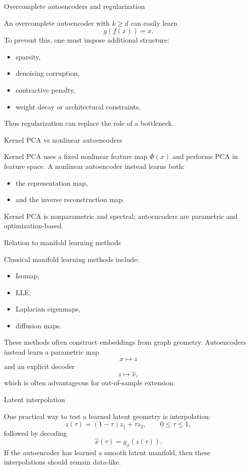 \documentclass[aspectratio=169]{beamer}
\begin{document}
\begin{frame}{Overcomplete autoencoders and regularization}

An overcomplete autoencoder with \(k\ge d\) can easily learn
\[
g(f(x))=x.
\]
To prevent this, one must impose additional structure:
\begin{itemize}
\item sparsity,
\item denoising corruption,
\item contractive penalty,
\item weight decay or architectural constraints.
\end{itemize}
Thus regularization can replace the role of a bottleneck.

\end{frame}

\begin{frame}{Kernel PCA vs nonlinear autoencoders}

Kernel PCA uses a fixed nonlinear feature map \(\Phi(x)\) and performs PCA in feature space.
A nonlinear autoencoder instead learns both:
\begin{itemize}
\item the representation map,
\item and the inverse reconstruction map.
\end{itemize}
Kernel PCA is nonparametric and spectral;
autoencoders are parametric and optimization-based.

\end{frame}

\begin{frame}{Relation to manifold learning methods}

Classical manifold learning methods include:
\begin{itemize}
\item Isomap,
\item LLE,
\item Laplacian eigenmaps,
\item diffusion maps.
\end{itemize}
These methods often construct embeddings from graph geometry.
Autoencoders instead learn a parametric map
\[
x \mapsto z
\]
and an explicit decoder
\[
z \mapsto \hat x,
\]
which is often advantageous for out-of-sample extension.

\end{frame}

\begin{frame}{Latent interpolation}

One practical way to test a learned latent geometry is interpolation:
\[
z(\tau)=(1-\tau)z_1+\tau z_2,\qquad 0\le \tau \le 1,
\]
followed by decoding
\[
\hat x(\tau)=g_\phi(z(\tau)).
\]
If the autoencoder has learned a smooth latent manifold, then these interpolations should remain data-like.

\end{frame}
\end{document}
